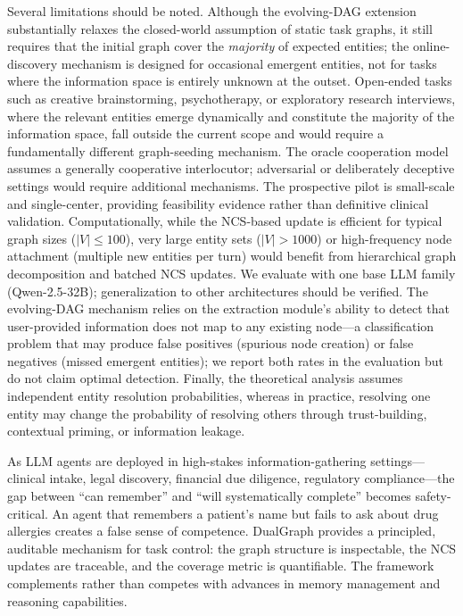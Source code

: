 \documentclass[11pt,a4paper]{article}
\begin{document}
Several limitations should be noted. Although the evolving-DAG extension
substantially relaxes the closed-world assumption of static task graphs,
it still requires that the initial graph cover the \emph{majority} of
expected entities; the online-discovery mechanism is designed for
occasional emergent entities, not for tasks where the information space
is entirely unknown at the outset. Open-ended tasks such as creative
brainstorming, psychotherapy, or exploratory research interviews, where
the relevant entities emerge dynamically and constitute the majority of
the information space, fall outside the current scope and would require a
fundamentally different graph-seeding mechanism. The oracle cooperation
model assumes a generally cooperative interlocutor; adversarial or
deliberately deceptive settings would require additional mechanisms. The
prospective pilot is small-scale and single-center, providing feasibility
evidence rather than definitive clinical validation. Computationally,
while the NCS-based update is efficient for typical graph sizes
($|V| \leq 100$), very large entity sets ($|V| > 1000$) or high-frequency
node attachment (multiple new entities per turn) would benefit from
hierarchical graph decomposition and batched NCS updates. We evaluate with
one base LLM family (Qwen-2.5-32B); generalization to other architectures
should be verified. The evolving-DAG mechanism relies on the extraction
module's ability to detect that user-provided information does not map to
any existing node---a classification problem that may produce false
positives (spurious node creation) or false negatives (missed emergent
entities); we report both rates in the evaluation but do not claim
optimal detection. Finally, the theoretical analysis assumes independent
entity resolution probabilities, whereas in practice, resolving one entity
may change the probability of resolving others through trust-building,
contextual priming, or information leakage.

As LLM agents are deployed in high-stakes information-gathering
settings---clinical intake, legal discovery, financial due diligence,
regulatory compliance---the gap between ``can remember'' and ``will
systematically complete'' becomes safety-critical. An agent that remembers
a patient's name but fails to ask about drug allergies creates a false
sense of competence. DualGraph provides a principled, auditable mechanism
for task control: the graph structure is inspectable, the NCS updates are
traceable, and the coverage metric is quantifiable. The framework
complements rather than competes with advances in memory management and
reasoning capabilities.
\end{document}
